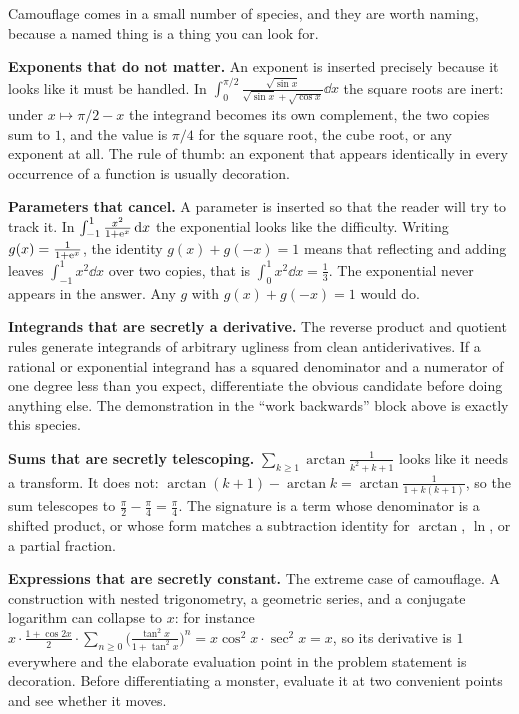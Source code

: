 Camouflage comes in a small number of species, and they are worth naming, because a named thing is a thing you can look for.

\textbf{Exponents that do not matter.} An exponent is inserted precisely because it looks like it must be handled. In $\int_{0}^{\pi/2}\frac{\sqrt{\sin x}}{\sqrt{\sin x}+\sqrt{\cos x}}\dd x$ the square roots are inert: under $x\mapsto \pi/2-x$ the integrand becomes its own complement, the two copies sum to $1$, and the value is $\pi/4$ for the square root, the cube root, or any exponent at all. The rule of thumb: an exponent that appears identically in every occurrence of a function is usually decoration.

\textbf{Parameters that cancel.} A parameter is inserted so that the reader will try to track it. In $\int_{-1}^{1}\frac{x^{2}}{1+\mathrm{e}^{x}}\,\mathrm{d} x$ the exponential looks like the difficulty. Writing $g(x)=\frac{1}{1+\mathrm{e}^{x}}$, the identity $g(x)+g(-x)=1$ means that reflecting and adding leaves $\int_{-1}^{1}x^{2}\dd x$ over two copies, that is $\int_{0}^{1}x^{2}\dd x=\tfrac13$. The exponential never appears in the answer. Any $g$ with $g(x)+g(-x)=1$ would do.

\textbf{Integrands that are secretly a derivative.} The reverse product and quotient rules generate integrands of arbitrary ugliness from clean antiderivatives. If a rational or exponential integrand has a squared denominator and a numerator of one degree less than you expect, differentiate the obvious candidate before doing anything else. The demonstration in the ``work backwards'' block above is exactly this species.

\textbf{Sums that are secretly telescoping.} $\sum_{k\geq 1}\arctan\frac{1}{k^{2}+k+1}$ looks like it needs a transform. It does not: $\arctan(k+1)-\arctan k=\arctan\frac{1}{1+k(k+1)}$, so the sum telescopes to $\frac{\pi}{2}-\frac{\pi}{4}=\frac{\pi}{4}$. The signature is a term whose denominator is a shifted product, or whose form matches a subtraction identity for $\arctan$, $\ln$, or a partial fraction.

\textbf{Expressions that are secretly constant.} The extreme case of camouflage. A construction with nested trigonometry, a geometric series, and a conjugate logarithm can collapse to $x$: for instance $x\cdot\frac{1+\cos 2x}{2}\cdot\sum_{n\geq 0}\bigl(\frac{\tan^{2}x}{1+\tan^{2}x}\bigr)^{n}=x\cos^{2}x\cdot\sec^{2}x=x$, so its derivative is $1$ everywhere and the elaborate evaluation point in the problem statement is decoration. Before differentiating a monster, evaluate it at two convenient points and see whether it moves.

